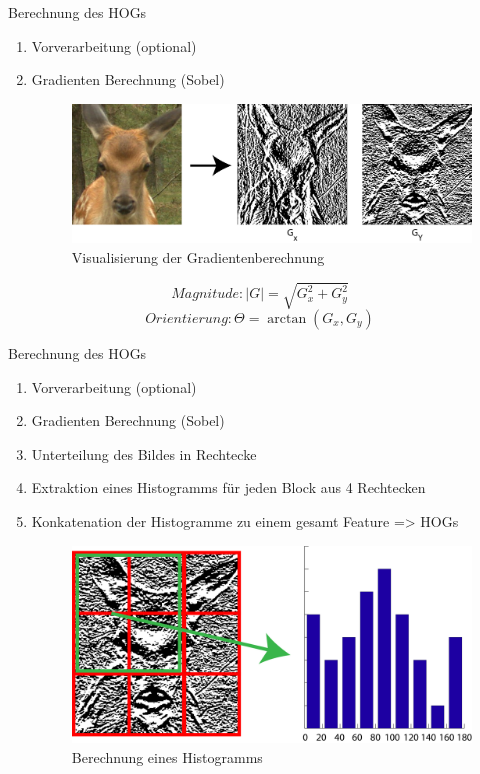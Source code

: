 \begin{frame}[t,fragile]{Berechnung des HOGs}
	\begin{enumerate}
 		\item Vorverarbeitung (optional)
		\item Gradienten Berechnung (Sobel)
	\begin{figure}
		\centering
		\includegraphics[scale=0.12]{img/sobel.png}
		\caption{Visualisierung der Gradientenberechnung }
	\end{figure}
  \end{enumerate}
	\begin{equation}
	Magnitude: |G| = \sqrt{G_x^2 + G_y^2}
	\end{equation}
\begin{equation}
    Orientierung: \Theta = \arctan({G_x, G_y})
\end{equation}
\end{frame}

\begin{frame}[t,fragile]{Berechnung des HOGs}
	\begin{enumerate}
 		\item Vorverarbeitung (optional)
		\item Gradienten Berechnung (Sobel)
		\item Unterteilung des Bildes in Rechtecke
		\item Extraktion eines Histogramms für jeden Block aus 4 Rechtecken
		\item Konkatenation der Histogramme zu einem gesamt Feature => HOGs
	\begin{figure}
		\centering
		\includegraphics[scale=0.12]{img/sobel2hog.png}
		\caption{Berechnung eines Histogramms}
	\end{figure}	
  \end{enumerate}
\end{frame}

